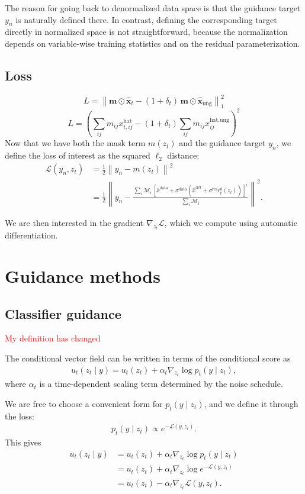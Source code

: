 \documentclass[a4paper,12pt]{article}
\begin{document}
The reason for going back to denormalized data space is that the guidance target $y_n$ is naturally defined there.
In contrast, defining the corresponding target directly in normalized space is not straightforward, because the normalization depends on variable-wise training statistics and on the residual parameterization.

\subsection{Loss}
$$
L = \left\| \mathbf{m} \odot \hat{\mathbf{x}}_t - (1+\delta_t)\,\mathbf{m} \odot \hat{\mathbf{x}}_{\mathrm{ung}} \right\|_1^2
$$
$$
L = \left( \sum_{ij} m_{ij} x^{\text{hat}}_{t,ij} - (1+\delta_t)\sum_{ij} m_{ij} x^{\text{hat,ung}}_{ij} \right)^2
$$
Now that we have both the mask term $m(z_t)$ and the guidance target $y_n$, we define the loss of interest as the squared $\ell_2$ distance:
\begin{align*} 
    \mathcal{L}(y_n, z_t) &= \frac{1}{2} \left\lVert y_n - m(z_t) \right\rVert^2 \\
    &= \frac{1}{2} \left\lVert
    y_n -
    \frac{\sum_i \mathcal{M}_i \, [\bar{x}^{\text{data}} + \sigma^{\text{data}}(\hat{x}^{\text{det}} + \sigma^{\text{res}} r_t^\theta(z_t))]^i}{\sum_i \mathcal{M}_i}
    \right\rVert^2.
\end{align*}

We are then interested in the gradient $\nabla_{z_t}\mathcal{L}$, which we compute using automatic differentiation.

\clearpage
\section{Guidance methods}
\subsection{Classifier guidance}

\textcolor{red}{My definition has changed}

The conditional vector field can be written in terms of the conditional score as
\begin{align*}
     u_t(z_t \mid y) = u_t(z_t) + \alpha_t \nabla_{z_t} \log p_t(y \mid z_t),
\end{align*}
where $\alpha_t$ is a time-dependent scaling term determined by the noise schedule.

We are free to choose a convenient form for $p_t(y \mid z_t)$, and we define it through the loss:
\begin{align*}
    p_t(y \mid z_t) \propto e^{-\mathcal{L}(y, z_t)}.
\end{align*}
This gives
\begin{align*}
    u_t(z_t \mid y)
    &= u_t(z_t) + \alpha_t \nabla_{z_t} \log p_t(y \mid z_t) \\
    &= u_t(z_t) + \alpha_t \nabla_{z_t} \log e^{-\mathcal{L}(y, z_t)} \\
    &= u_t(z_t) - \alpha_t \nabla_{z_t} \mathcal{L}(y, z_t).
\end{align*}
\end{document}
